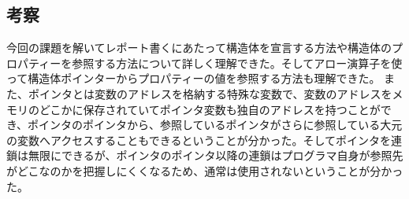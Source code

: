 \documentclass[10pt]{article}
\begin{document}
\pagebreak

\subsection{考察}
今回の課題を解いてレポート書くにあたって構造体を宣言する方法や構造体のプロパティーを参照する方法について詳しく理解できた。そしてアロー演算子を使って構造体ポインターからプロパティーの値を参照する方法も理解できた。
また、ポインタとは変数のアドレスを格納する特殊な変数で、変数のアドレスをメモリのどこかに保存されていてポインタ変数も独自のアドレスを持つことができ、ポインタのポインタから、参照しているポインタがさらに参照している大元の変数へアクセスすることもできるということが分かった。そしてポインタを連鎖は無限にできるが、ポインタのポインタ以降の連鎖はプログラマ自身が参照先がどこなのかを把握しにくくなるため、通常は使用されないということが分かった。
\end{document}
